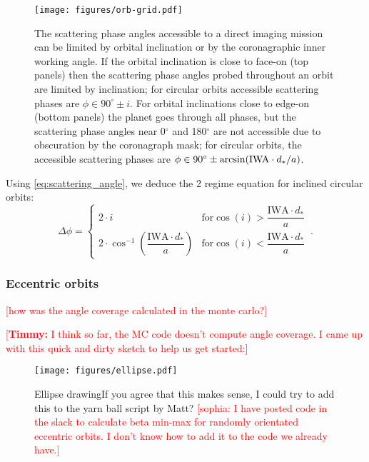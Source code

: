 \documentclass[
    usenatbib,
]{mnras}
\newcommand{\todo}[1]{\textcolor{red}{[#1]}}
\newcommand{\timmy}[1]{\textcolor{red}{[\textbf{Timmy:} #1]}} %
\begin{document}
\begin{figure}
   \centering
   \texttt{[image: figures/orb-grid.pdf]}
   \caption{
        The scattering phase angles accessible to a direct imaging mission can be limited by orbital inclination or by the coronagraphic inner working angle. 
        If the orbital inclination is close to face-on (top panels) then the scattering phase angles probed throughout an orbit are limited by inclination; for circular orbits accessible scattering phases are $\phi \in 90^\circ \pm i$. 
        For orbital inclinations close to edge-on (bottom panels) the planet goes through all phases, but the scattering phase angles near 0$^\circ$ and 180$^\circ$ are not accessible due to obscuration by the coronagraph mask; for circular orbits, the accessible scattering phases are $\phi \in 90^\circ \pm \arcsin({\rm IWA}\cdot d_*/a)$.
    }
    \label{fig:orb-grid}
\end{figure}

Using \cref{eq:scattering_angle}, we deduce the 2 regime equation for inclined circular orbits: 
\begin{equation}
\label{eq:Delta_phi_max}
    \Delta \phi = 
    \begin{cases}
        2 \cdot i & \textrm{for} \cos(i) > \dfrac{\mathrm{IWA}\cdot d_* }{a}
  \\ 
        2 \cdot \cos^{-1}\left(\dfrac{\mathrm{IWA}\cdot d_* }{a}\right)  & \textrm{for} \cos(i) < \dfrac{\mathrm{IWA}\cdot d_* }{a}
    \end{cases}\,.
\end{equation}


\subsubsection{Eccentric orbits}

\todo{how was the angle coverage calculated in the monte carlo?}

\timmy{I think so far, the MC code doesn't compute angle coverage. I came up with this quick and dirty sketch to help us get started:}


\begin{figure}
   \centering
   \texttt{[image: figures/ellipse.pdf]}
   \caption{
  Ellipse drawingIf you agree that this makes sense, I could try to add this to the yarn ball script by Matt? \todo{sophia: I have posted code in the slack to calculate beta min-max for randomly orientated eccentric orbits. I don't know how to add it to the code we already have.}}
    \label{fig:ellipse}
\end{figure}
\end{document}
